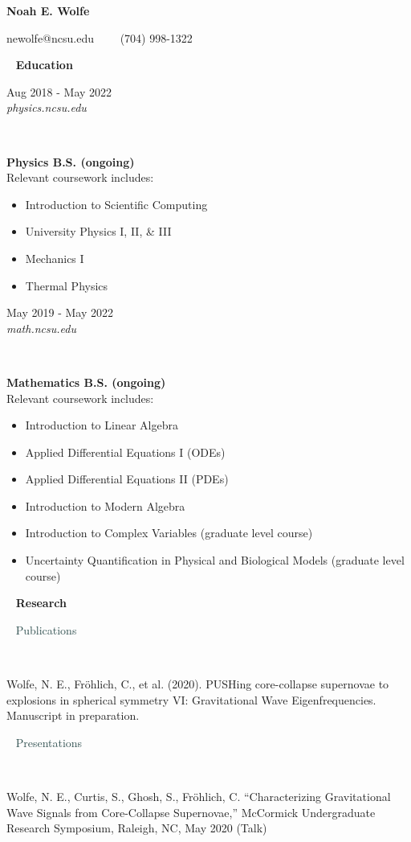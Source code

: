 \documentclass[8pt]{article}
\def \primarycolor   {spacecadet}
\def \secondarycolor {darkslategray}
\def \tertiarycolor  {airforceblue} %
\def \titlerectmin{0.15cm}
\def \titlerectmax{0.35cm}
\def \leftcolwidth{3.05cm}
\newcommand{\cvheader}[1]{
    \tikz{\fill [\primarycolor] (0,\titlerectmin) rectangle (\leftcolwidth,\titlerectmax);} \ 
    \textcolor{\primarycolor}{ \large{\textbf{#1}} } 
}
\newcommand{\cvsubtitle}[1]{
    \hspace{\leftcolwidth} \ \textcolor{\secondarycolor}{ \large{{#1}} }
}
\newcommand{\cventry}[4]{
    \begin{minipage}[t]{\leftcolwidth} 
        \small{
            \begin{flushright}
                #2\\
                \textcolor{\tertiarycolor}{\textit{#4}}
            \end{flushright}
        }
    \end{minipage} \ \
    \begin{minipage}[t]{\linewidth-\leftcolwidth} \normalsize{\textbf{#1} \\ #3} \end{minipage}
} %
\newcommand{\cventrysingle}[3]{
    \begin{minipage}[t]{\leftcolwidth} \small{#2 \begin{flushleft}\textcolor{\tertiarycolor}{\textit{#3}} \end{flushleft} } 
    \end{minipage} \ \
    \begin{minipage}[t]{\linewidth-\leftcolwidth} \normalsize{{#1}} \end{minipage}
}
\begin{document}

\begin{center}
{\LARGE \textbf{Noah E. Wolfe}}

newolfe@ncsu.edu\ \ \textbullet
\ \ (704) 998-1322
\\
\end{center}

\cvheader{Education}

\cventry{Physics B.S. (ongoing)}{Aug 2018 - May 2022}{Relevant coursework includes: 
    \begin{itemize}
        \item{Introduction to Scientific Computing}
        \item{University Physics I, II, \& III}
        \item{Mechanics I}
        \item{Thermal Physics}
    \end{itemize}
}{physics.ncsu.edu}


\cventry{Mathematics B.S. (ongoing)}{May 2019 - May 2022}{Relevant coursework includes:
    \begin{itemize}
        \item{Introduction to Linear Algebra}
        \item{Applied Differential Equations I (ODEs)}
        \item{Applied Differential Equations II (PDEs)}
        \item{Introduction to Modern Algebra}
        \item{Introduction to Complex Variables (graduate level course)}
        \item{Uncertainty Quantification in Physical and Biological Models (graduate level course)} %
    \end{itemize}
}{math.ncsu.edu}

\cvheader{Research}

\cvsubtitle{Publications}

\cventrysingle{Wolfe, N. E., Fr\"ohlich, C., et al. (2020). PUSHing core-collapse supernovae to explosions in spherical symmetry VI: Gravitational Wave Eigenfrequencies. Manuscript in preparation.}{}{}

\cvsubtitle{Presentations}

\cventrysingle{Wolfe, N. E., Curtis, S., Ghosh, S., Fr\"ohlich, C. “Characterizing Gravitational Wave Signals from Core-Collapse Supernovae,” McCormick Undergraduate Research Symposium, Raleigh, NC, May 2020 (Talk)}{}{}
\end{document}
